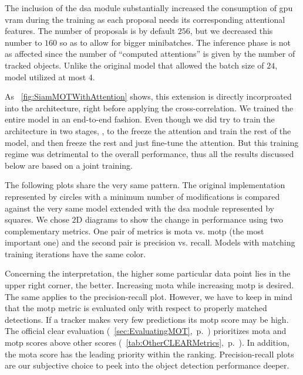 The inclusion of the \gls{dsa} module substantially increased the consumption of \gls{gpu} \gls{vram} during the training as each proposal needs its corresponding attentional features. The number of proposals is by default $256$, but we decreased this number to $160$ so as to allow for bigger minibatches. The inference phase is not as affected since the number of ``computed attentions'' is given by the number of tracked objects. Unlike the original model that allowed the batch size of $24$, \dsamodel{} model utilized at most $4$.

As \figtext{}~\ref{fig:SiamMOTWithAttention} shows, this extension is directly incorproated into the architecture, right before applying the cross-correlation. We trained the entire model in an end-to-end fashion. Even though we did try to train the architecture in two stages, \ietext{}, to the freeze the attention and train the rest of the model, and then freeze the rest and just fine-tune the attention. But this training regime was detrimental to the overall performance, thus all the results discussed below are based on a joint training.

The following plots share the very same pattern. The original implementation represented by circles with a minimum number of modifications is compared against the very same model extended with the \gls{dsa} module represented by squares. We chose $2$D diagrams to show the change in performance using two complementary metrics. One pair of metrics is \gls{mota} vs. \gls{motp} (the most important one) and the second pair is precision vs. recall. Models with matching training iterations have the same color.

Concerning the interpretation, the higher some particular data point lies in the upper right corner, the better. Increasing \gls{mota} while increasing \gls{motp} is desired. The same applies to the precision-recall plot. However, we have to keep in mind that the \gls{motp} metric is evaluated only with respect to properly matched detections. If a tracker makes very few predictions its \gls{motp} score may be high. The official \gls{clear} evaluation (\sectiontext{}~\ref{sec:EvaluatingMOT},~p.~\pageref{sec:EvaluatingMOT}) prioritizes \gls{mota} and \gls{motp} scores above other scores (\tabletext{}~\ref{tab:OtherCLEARMetrics},~p.~\pageref{tab:OtherCLEARMetrics}). In addition, the \gls{mota} score has the leading priority within the ranking. Precision-recall plots are our subjective choice to peek into the object detection performance deeper.

